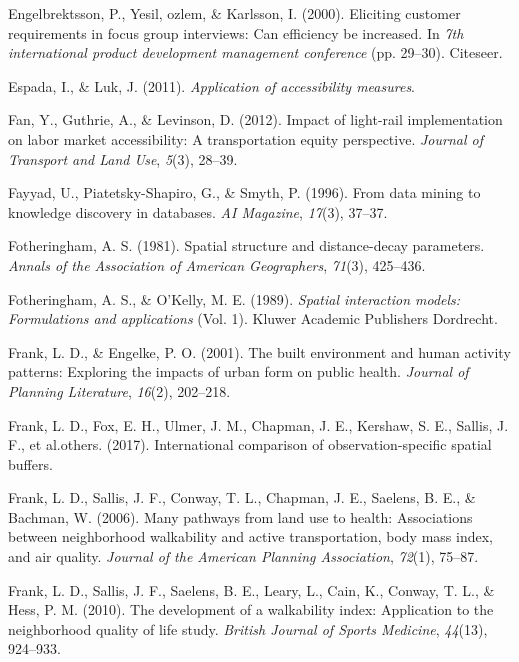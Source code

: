 \documentclass[
11pt, %
oneside, %
english, %
singlespacing, %
]{macthesis} %
\newlength{\cslhangindent}
\newenvironment{CSLReferences}[2] %
 {%
  \setlength{\parindent}{0pt}
  \ifodd #1 \everypar{\setlength{\hangindent}{\cslhangindent}}\ignorespaces\fi
  \ifnum #2 > 0
  \setlength{\parskip}{#2\baselineskip}
  \fi
 }%
 {}
\begin{document}
\begin{CSLReferences}{1}{0}
Engelbrektsson, P., Yesil, ozlem, \& Karlsson, I. (2000). Eliciting customer requirements in focus group interviews: Can efficiency be increased. In \emph{7th international product development management conference} (pp. 29--30). Citeseer.

Espada, I., \& Luk, J. (2011). \emph{Application of accessibility measures}.

Fan, Y., Guthrie, A., \& Levinson, D. (2012). Impact of light-rail implementation on labor market accessibility: A transportation equity perspective. \emph{Journal of Transport and Land Use}, \emph{5}(3), 28--39.

Fayyad, U., Piatetsky-Shapiro, G., \& Smyth, P. (1996). From data mining to knowledge discovery in databases. \emph{AI Magazine}, \emph{17}(3), 37--37.

Fotheringham, A. S. (1981). Spatial structure and distance-decay parameters. \emph{Annals of the Association of American Geographers}, \emph{71}(3), 425--436.

Fotheringham, A. S., \& O'Kelly, M. E. (1989). \emph{Spatial interaction models: Formulations and applications} (Vol. 1). Kluwer Academic Publishers Dordrecht.

Frank, L. D., \& Engelke, P. O. (2001). The built environment and human activity patterns: Exploring the impacts of urban form on public health. \emph{Journal of Planning Literature}, \emph{16}(2), 202--218.

Frank, L. D., Fox, E. H., Ulmer, J. M., Chapman, J. E., Kershaw, S. E., Sallis, J. F., et al.others. (2017). International comparison of observation-specific spatial buffers.

Frank, L. D., Sallis, J. F., Conway, T. L., Chapman, J. E., Saelens, B. E., \& Bachman, W. (2006). Many pathways from land use to health: Associations between neighborhood walkability and active transportation, body mass index, and air quality. \emph{Journal of the American Planning Association}, \emph{72}(1), 75--87.

Frank, L. D., Sallis, J. F., Saelens, B. E., Leary, L., Cain, K., Conway, T. L., \& Hess, P. M. (2010). The development of a walkability index: Application to the neighborhood quality of life study. \emph{British Journal of Sports Medicine}, \emph{44}(13), 924--933.


\end{CSLReferences}
\end{document}
